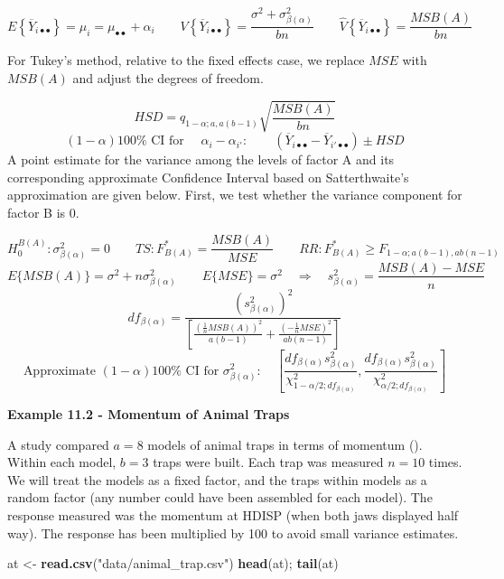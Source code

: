 \documentclass[
]{book}
\newenvironment{Shaded}{\begin{snugshade}}{\end{snugshade}}
\newcommand{\FunctionTok}[1]{\textcolor[rgb]{0.13,0.29,0.53}{\textbf{#1}}}
\newcommand{\NormalTok}[1]{#1}
\newcommand{\OtherTok}[1]{\textcolor[rgb]{0.56,0.35,0.01}{#1}}
\newcommand{\StringTok}[1]{\textcolor[rgb]{0.31,0.60,0.02}{#1}}
\begin{document}
\[
E\left\{\overline{Y}_{i\bullet\bullet}\right\}=\mu_i=
\mu_{\bullet\bullet}+\alpha_i   \qquad
V\left\{\overline{Y}_{i\bullet\bullet}\right\}=
\frac{\sigma^2+\sigma_{\beta(\alpha)}^2}{bn}
\qquad
\hat{V}\left\{\overline{Y}_{i\bullet\bullet}\right\}=\frac{MSB(A)}{bn}
\]

For Tukey's method, relative to the fixed effects case, we replace
\(MSE\) with \(MSB(A)\) and adjust the degrees of freedom.

\[
HSD = q_{1-\alpha;a,a(b-1)}\sqrt{\frac{MSB(A)}{bn}}
\] \[
(1-\alpha)100\% \mbox{ CI for } \quad \alpha_i-\alpha_{i'}:
\qquad 
\left(\overline{Y}_{i\bullet\bullet}-\overline{Y}_{i'\bullet\bullet}
\right) \pm HSD
\] A point estimate for the variance among the levels of factor A and
its corresponding approximate Confidence Interval based on
Satterthwaite's approximation are given below. First, we test whether
the variance component for factor B is 0.

\[
H_0^{B(A)}:\sigma_{\beta(\alpha)}^2=0 \qquad
TS: F_{B(A)}^*=\frac{MSB(A)}{MSE}   \qquad
RR: F_{B(A)}^* \geq F_{1-\alpha;a(b-1),ab(n-1)}
\] \[
E\{MSB(A)\}=\sigma^2+n\sigma_{\beta(\alpha)}^2 \qquad E\{MSE\}=\sigma^2
\quad \Rightarrow \quad s_{\beta(\alpha)}^2=\frac{MSB(A)-MSE}{n}
\] \[
df_{\beta(\alpha)} = \frac{\left(s_{\beta(\alpha)}^2\right)^2}{
\left[\frac{\left(\frac{1}{n}MSB(A)\right)^2}{a(b-1)} +
\frac{\left(-\frac{1}{n}MSE\right)^2}{ab(n-1)} \right]
}
\] \[
\mbox{Approximate } (1-\alpha)100\% \mbox{ CI for }
\sigma_{\beta(\alpha)}^2: \quad
\left[
\frac{df_{\beta(\alpha)}s_{\beta(\alpha)}^2}{
\chi_{1-\alpha/2; df_{\beta(\alpha)}}^2},
\frac{df_{\beta(\alpha)}s_{\beta(\alpha)}^2}{
\chi_{\alpha/2; df_{\beta(\alpha)}}^2}
\right]
\]

\textbf{Example 11.2 - Momentum of Animal Traps}

A study compared \(a=8\) models of animal traps in terms of momentum
(). Within each model,
\(b=3\) traps were built. Each trap was measured \(n=10\) times. We will
treat the models as a fixed factor, and the traps within models as a
random factor (any number could have been assembled for each model). The
response measured was the momentum at HDISP (when both jaws displayed
half way). The response has been multiplied by 100 to avoid small
variance estimates.

\begin{Shaded}
\begin{Highlighting}[]
\NormalTok{at }\OtherTok{\textless{}{-}} \FunctionTok{read.csv}\NormalTok{(}\StringTok{"data/animal\_trap.csv"}\NormalTok{)}
\FunctionTok{head}\NormalTok{(at); }\FunctionTok{tail}\NormalTok{(at)}
\end{Highlighting}
\end{Shaded}
\end{document}
